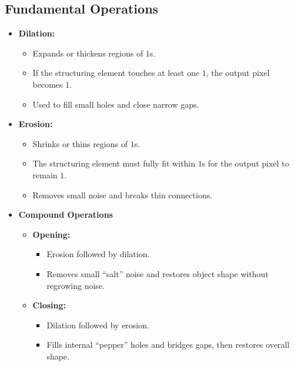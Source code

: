 \documentclass[12pt]{article}
\begin{document}
\subsection{Fundamental Operations}
\begin{itemize}
    \item \textbf{Dilation:}
          \begin{itemize}
              \item Expands or thickens regions of $1$s.
              \item If the structuring element touches at least one $1$, the output pixel becomes $1$.
              \item Used to fill small holes and close narrow gaps.
          \end{itemize}

    \item \textbf{Erosion:}
          \begin{itemize}
              \item Shrinks or thins regions of $1$s.
              \item The structuring element must fully fit within $1$s for the output pixel to remain $1$.
              \item Removes small noise and breaks thin connections.
          \end{itemize}
    \item \textbf{Compound Operations}
          \begin{itemize}
              \item \textbf{Opening:}
                    \begin{itemize}
                        \item Erosion followed by dilation.
                        \item Removes small ``salt'' noise and restores object shape without regrowing noise.
                    \end{itemize}

              \item \textbf{Closing:}
                    \begin{itemize}
                        \item Dilation followed by erosion.
                        \item Fills internal ``pepper'' holes and bridges gaps, then restores overall shape.
                    \end{itemize}
          \end{itemize}
\end{itemize}
\end{document}
